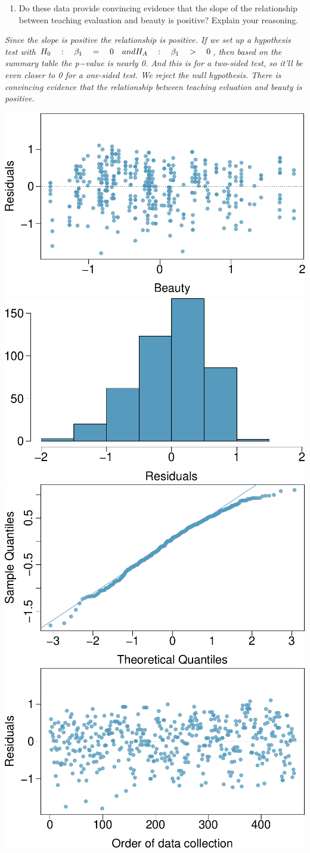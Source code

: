 \documentclass[]{article}
\providecommand{\tightlist}{%
  \setlength{\itemsep}{0pt}\setlength{\parskip}{0pt}}
\begin{document}
\begin{enumerate}
\def\labelenumi{(\alph{enumi})}
\setcounter{enumi}{1}
\tightlist
\item
  Do these data provide convincing evidence that the slope of the
  relationship between teaching evaluation and beauty is positive?
  Explain your reasoning.
\end{enumerate}

\emph{Since the slope is positive the relationship is positive. If we
set up a hypothesis test with
\({ H }_{ 0 }\quad :\quad { \beta }_{ 1 }\quad =\quad 0\quad and\quad \\ { H }_{ A }\quad :\quad { \beta }_{ 1 }\quad >\quad 0\),
then based on the summary table the p−value is nearly 0. And this is for
a two-sided test, so it'll be even closer to 0 for a one-sided test. We
reject the null hypothesis. There is convincing evidence that the
relationship between teaching evluation and beauty is positive.}

\includegraphics[width=0.5\linewidth]{Homework_8_files/figure-latex/unnamed-chunk-7-1}
\includegraphics[width=0.5\linewidth]{Homework_8_files/figure-latex/unnamed-chunk-7-2}
\includegraphics[width=0.5\linewidth]{Homework_8_files/figure-latex/unnamed-chunk-7-3}
\includegraphics[width=0.5\linewidth]{Homework_8_files/figure-latex/unnamed-chunk-7-4}
\end{document}
